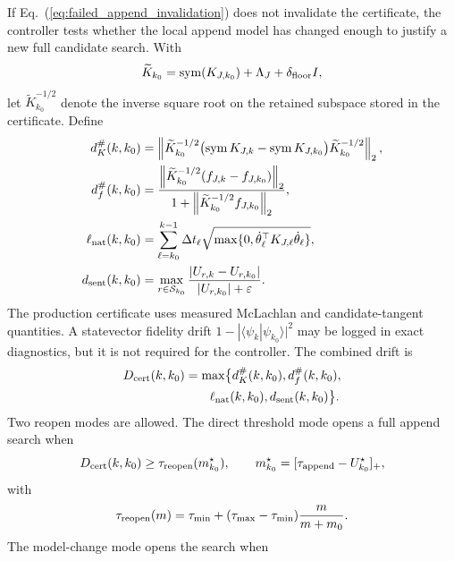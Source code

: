 \documentclass[
  reprint,
  amsmath,
  amssymb,
  aps,
  pra,
  nofootinbib,
  superscriptaddress,
  floatfix
]{revtex4-2}
\newcommand{\app}{\mathrm{append}}
\newcommand{\eps}{\varepsilon}
\begin{document}
If Eq.~(\ref{eq:failed_append_invalidation}) does not invalidate the certificate, the controller tests whether the local append model has changed enough to justify a new full candidate search.  With
\[
\widetilde K_{k_0}
=\operatorname{sym}(K_{J,k_0})+\Lambda_J+\delta_{\rm floor}I,
\]
let $\widetilde K_{k_0}^{-1/2}$ denote the inverse square root on the retained subspace stored in the certificate.  Define
\begin{equation}
\begin{aligned}
d_K^\#(k,k_0)
&=
\left\|
\widetilde K_{k_0}^{-1/2}
\bigl(\operatorname{sym}K_{J,k}-\operatorname{sym}K_{J,k_0}\bigr)
\widetilde K_{k_0}^{-1/2}
\right\|_2,\\
d_f^\#(k,k_0)
&=
\frac{
\left\|
\widetilde K_{k_0}^{-1/2}(f_{J,k}-f_{J,k_0})
\right\|_2
}{
1+\left\|\widetilde K_{k_0}^{-1/2}f_{J,k_0}\right\|_2
},\\
\ell_{\rm nat}(k,k_0)
&=
\sum_{\ell=k_0}^{k-1}
\Delta t_\ell
\sqrt{\max\{0,\dot\theta_\ell^\top K_{J,\ell}\dot\theta_\ell\}},\\
d_{\rm sent}(k,k_0)
&=
\max_{r\in\mathcal S_{k_0}}
\frac{|U_{r,k}-U_{r,k_0}|}{|U_{r,k_0}|+\eps}.
\end{aligned}
\label{eq:failed_append_drift_metrics}
\end{equation}
The production certificate uses measured McLachlan and candidate-tangent quantities.  A statevector fidelity drift $1-|\langle\psi_k|\psi_{k_0}\rangle|^2$ may be logged in exact diagnostics, but it is not required for the controller.  The combined drift is
\begin{equation}
\begin{aligned}
D_{\rm cert}(k,k_0)
&=
\max\bigl\{
d_K^\#(k,k_0),d_f^\#(k,k_0),\\
&\qquad
\ell_{\rm nat}(k,k_0),d_{\rm sent}(k,k_0)
\bigr\}.
\end{aligned}
\label{eq:failed_append_combined_drift}
\end{equation}
Two reopen modes are allowed.  The direct threshold mode opens a full append search when
\begin{equation}
D_{\rm cert}(k,k_0)\ge\tau_{\rm reopen}(m^\star_{k_0}),
\qquad
m^\star_{k_0}=[\tau_{\app}-U^\star_{k_0}]_+,
\label{eq:failed_append_direct_reopen}
\end{equation}
with
\begin{equation}
\tau_{\rm reopen}(m)
=
\tau_{\min}+(\tau_{\max}-\tau_{\min})
\frac{m}{m+m_0}.
\label{eq:failed_append_tau_reopen}
\end{equation}
The model-change mode opens the search when
\end{document}
